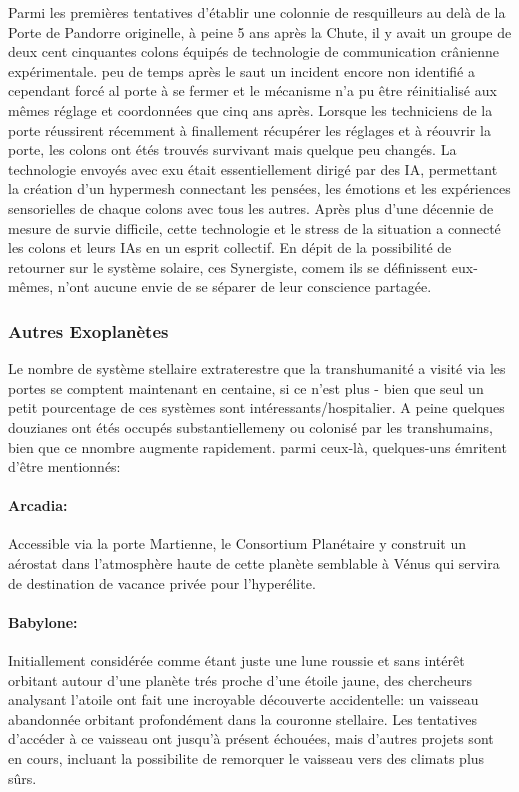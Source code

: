 Parmi les premières tentatives d'établir une colonnie de resquilleurs au delà de la Porte de Pandorre originelle, à peine 5 ans après la Chute, il y avait un groupe de deux cent cinquantes colons équipés de technologie de communication crânienne expérimentale. peu de temps après le saut un incident encore non identifié a cependant forcé al porte à se fermer et le mécanisme n'a pu être réinitialisé aux mêmes réglage et coordonnées que cinq ans après. Lorsque les techniciens de la porte réussirent récemment à finallement récupérer les réglages et à réouvrir la porte, les colons ont étés trouvés survivant mais quelque peu changés. La technologie envoyés avec exu était essentiellement dirigé par des IA, permettant la création d'un hypermesh connectant les pensées, les émotions et les expériences sensorielles de chaque colons avec tous les autres. Après plus d'une décennie de mesure de survie difficile, cette technologie et le stress de la situation a connecté les colons et leurs IAs en un esprit collectif. En dépit de la possibilité de retourner sur le système solaire, ces Synergiste, comem ils se définissent eux-mêmes, n'ont aucune envie de se séparer de leur conscience partagée. 

\subsubsection{Autres Exoplanètes} \label{sec:other-exoplanets} 

Le nombre de système stellaire extraterestre que la transhumanité a visité via les portes se comptent maintenant en centaine, si ce n'est plus - bien que seul un petit pourcentage de ces systèmes sont intéressants/hospitalier. A peine quelques douzianes ont étés occupés substantiellemeny ou colonisé par les transhumains, bien que ce nnombre augmente rapidement. parmi ceux-là, quelques-uns émritent d'être mentionnés: 

\paragraph{Arcadia:} \label{sec:arcadia} Accessible via la porte Martienne, le Consortium Planétaire y construit un aérostat dans l'atmosphère haute de cette planète semblable à Vénus qui servira de destination de vacance privée pour l'hyperélite. 

\paragraph{Babylone:} \label{sec:babylon} Initiallement considérée comme étant juste une lune roussie et sans intérêt orbitant autour d'une planète trés proche d'une étoile jaune, des chercheurs analysant l'atoile ont fait une incroyable découverte accidentelle: un vaisseau abandonnée orbitant profondément dans la couronne stellaire. Les tentatives d'accéder à ce vaisseau ont jusqu'à présent échouées, mais d'autres projets sont en cours, incluant la possibilite de remorquer le vaisseau vers des climats plus sûrs. 

